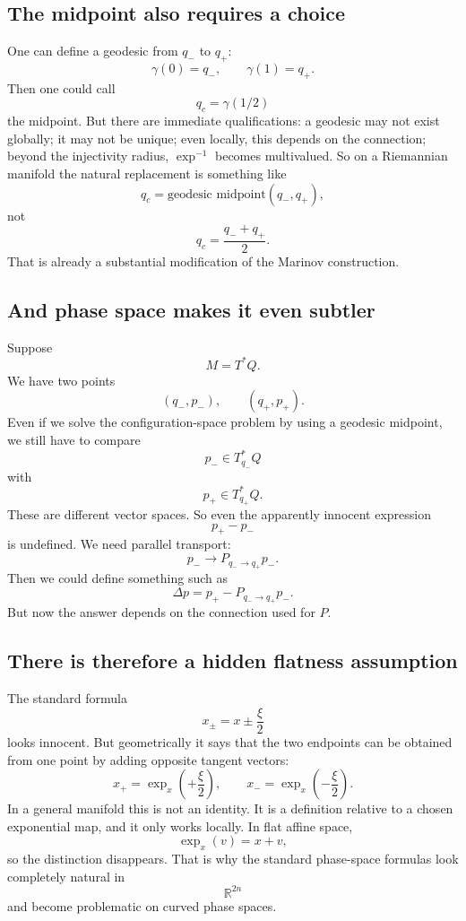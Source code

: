 \subsection{ The midpoint also requires a choice}
One can define a geodesic from \(q_-\) to \(q_+\):
$$ \gamma(0)=q_-, \qquad \gamma(1)=q_+. $$
Then one could call
$$ q_c=\gamma(1/2) $$
the midpoint.
But there are immediate qualifications:
a geodesic may not exist globally;
it may not be unique;
even locally, this depends on the connection;
beyond the injectivity radius, \(\exp^{-1}\) becomes multivalued.
So on a Riemannian manifold the natural replacement is something like
$$ \boxed{ q_c=\text{geodesic midpoint}(q_-,q_+), } $$
not
$$ q_c=\frac{q_-+q_+}{2}. $$
That is already a substantial modification of the Marinov construction.

\subsection{And phase space makes it even subtler}
Suppose
$$ M=T^*Q. $$
We have two points
$$ (q_-,p_-), \qquad (q_+,p_+). $$
Even if we solve the configuration-space problem by using a geodesic midpoint,
we still have to compare
$$ p_-\in T^*_{q_-}Q $$
with
$$ p_+\in T^*_{q_+}Q. $$
These are different vector spaces.
So even the apparently innocent expression
$$ p_+-p_- $$
is undefined.
We need parallel transport:
$$ p_- \longrightarrow P_{q_-\to q_+}p_-. $$
Then we could define something such as
$$ \Delta p = p_+ - P_{q_-\to q_+}p_-. $$
But now the answer depends on the connection used for \(P\).

\subsection{There is therefore a hidden flatness assumption}
The standard formula
$$ x_\pm=x\pm\frac{\xi}{2} $$
looks innocent.
But geometrically it says that the two endpoints can be obtained from one point
by adding opposite tangent vectors:
$$ x_+=\exp_x\left(+\frac{\xi}{2}\right), 
\qquad x_-=\exp_x\left(-\frac{\xi}{2}\right). $$
In a general manifold this is not an identity.
It is a definition relative to a chosen exponential map, and it only works
locally.
In flat affine space,
$$ \exp_x(v)=x+v, $$
so the distinction disappears.
That is why the standard phase-space formulas look completely natural in
$$ \mathbb R^{2n} $$
and become problematic on curved phase spaces.

